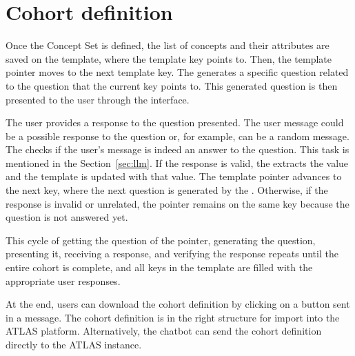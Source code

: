 \section{Cohort definition}




Once the Concept Set is defined, the list of concepts and their attributes are saved on the template, where the template key points to. Then, the template pointer moves to the next template key. The {\llm} generates a specific question related to the question that the current key points to. This generated question is then presented to the user through the interface.

The user provides a response to the question presented. The user message could be a possible response to the question or, for example, can be a random message. The {\llm} checks if the user's message is indeed an answer to the question. This task is mentioned in the Section~\ref{sec:llm}. If the response is valid, the {\llm} extracts the value and the template is updated with that value. The template pointer advances to the next key, where the next question is generated by the {\llm}. Otherwise, if the response is invalid or unrelated, the pointer remains on the same key because the question is not answered yet.

This cycle of getting the question of the pointer, generating the question, presenting it, receiving a response, and verifying the response repeats until the entire cohort is complete, and all keys in the template are filled with the appropriate user responses.

At the end, users can download the cohort definition by clicking on a button sent in a message. The cohort definition is in the right structure for import into the ATLAS platform. Alternatively, the chatbot can send the cohort definition directly to the ATLAS instance.


